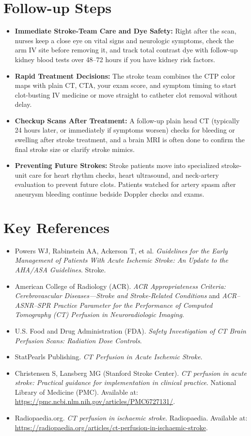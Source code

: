 \section{Follow-up Steps}
\begin{itemize}
    \item \textbf{Immediate Stroke-Team Care and Dye Safety:} Right after the scan, nurses keep a close eye on vital signs and neurologic symptoms, check the arm IV site before removing it, and track total contrast dye with follow-up kidney blood tests over 48--72 hours if you have kidney risk factors.
    \item \textbf{Rapid Treatment Decisions:} The stroke team combines the CTP color maps with plain CT, CTA, your exam score, and symptom timing to start clot-busting IV medicine or move straight to catheter clot removal without delay.
    \item \textbf{Checkup Scans After Treatment:} A follow-up plain head CT (typically 24 hours later, or immediately if symptoms worsen) checks for bleeding or swelling after stroke treatment, and a brain MRI is often done to confirm the final stroke size or clarify stroke mimics.
    \item \textbf{Preventing Future Strokes:} Stroke patients move into specialized stroke-unit care for heart rhythm checks, heart ultrasound, and neck-artery evaluation to prevent future clots. Patients watched for artery spasm after aneurysm bleeding continue bedside Doppler checks and exams.
\end{itemize}

\section{Key References}
\begin{itemize}
    \item Powers WJ, Rabinstein AA, Ackerson T, et al. \textit{Guidelines for the Early Management of Patients With Acute Ischemic Stroke: An Update to the AHA/ASA Guidelines}. Stroke.
    \item American College of Radiology (ACR). \textit{ACR Appropriateness Criteria: Cerebrovascular Diseases---Stroke and Stroke-Related Conditions} and \textit{ACR--ASNR--SPR Practice Parameter for the Performance of Computed Tomography (CT) Perfusion in Neuroradiologic Imaging}.
    \item U.S. Food and Drug Administration (FDA). \textit{Safety Investigation of CT Brain Perfusion Scans: Radiation Dose Controls}.
    \item StatPearls Publishing. \textit{CT Perfusion in Acute Ischemic Stroke}.
    \item Christensen S, Lansberg MG (Stanford Stroke Center). \textit{CT perfusion in acute stroke: Practical guidance for implementation in clinical practice}. National Library of Medicine (PMC). Available at: \url{https://pmc.ncbi.nlm.nih.gov/articles/PMC6727131/}.
    \item Radiopaedia.org. \textit{CT perfusion in ischaemic stroke}. Radiopaedia. Available at: \url{https://radiopaedia.org/articles/ct-perfusion-in-ischaemic-stroke}.
\end{itemize}


